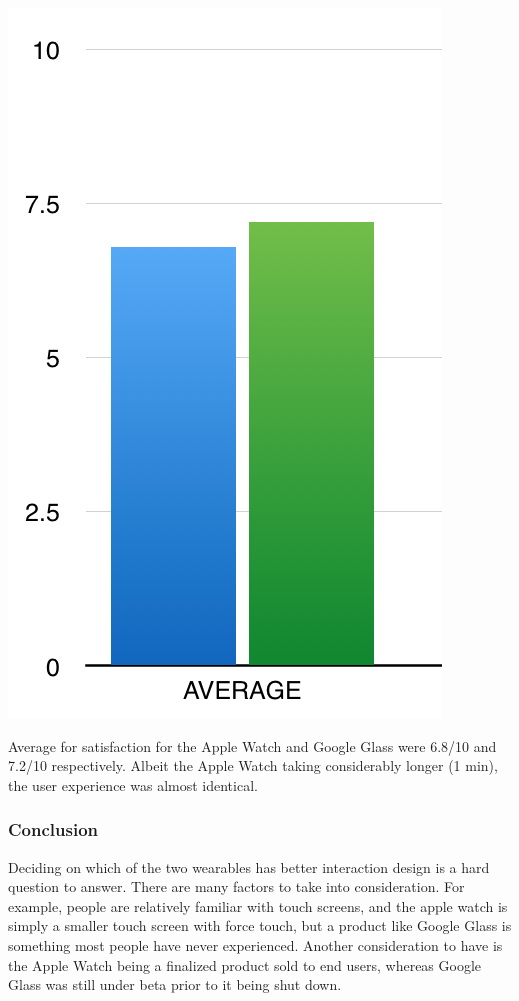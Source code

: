 \documentclass[paper=a4, fontsize=11pt]{scrartcl}	%
\numberwithin{equation}{section}															%
\numberwithin{figure}{section}																%
\numberwithin{table}{section}																%
\begin{document}
\includegraphics[scale=0.8]{task3satav}

Average for satisfaction for the Apple Watch and Google Glass were 6.8/10 and 7.2/10 respectively. Albeit the Apple Watch taking considerably longer (1 min), the user experience was almost identical.




\subsubsection{Conclusion}
Deciding on which of the two wearables has better interaction design is a hard question to answer. There are many factors to take into consideration. For example, people are relatively familiar with touch screens, and the apple watch is simply a smaller touch screen with force touch, but a product like Google Glass is something most people have never experienced. Another consideration to have is the Apple Watch being a finalized product sold to end users, whereas Google Glass was still under beta prior to it being shut down.  
\end{document}
